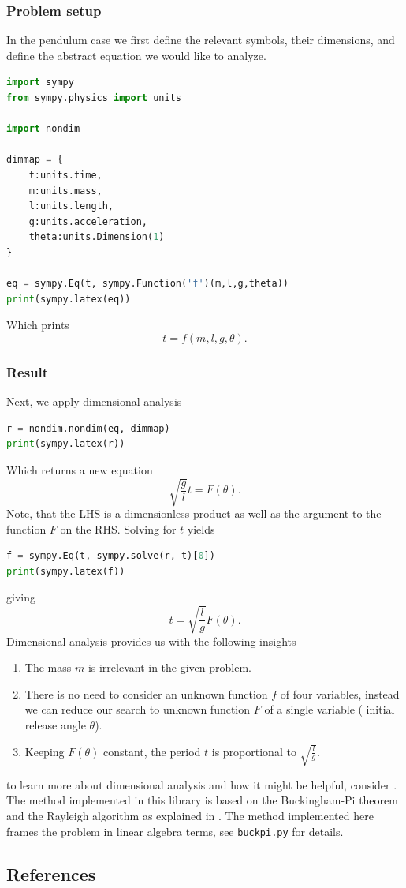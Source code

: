 \documentclass[11pt]{article}
\begin{document}
\subsubsection{Problem setup}
In the pendulum case we first define the relevant symbols, their dimensions, and define the abstract equation we would like to analyze.
\begin{lstlisting}[language=Python]
import sympy
from sympy.physics import units

import nondim

dimmap = {
    t:units.time, 
    m:units.mass, 
    l:units.length, 
    g:units.acceleration, 
    theta:units.Dimension(1)
}

eq = sympy.Eq(t, sympy.Function('f')(m,l,g,theta))
print(sympy.latex(eq))
\end{lstlisting}
Which prints $$t = f{\left(m,l,g,\theta \right)}.$$

\subsubsection{Result}
Next, we apply dimensional analysis
\begin{lstlisting}[language=Python]
r = nondim.nondim(eq, dimmap)
print(sympy.latex(r))
\end{lstlisting}
Which returns a new equation $$\sqrt{\frac{g}{l}}t = F{\left(\theta \right)}.$$ Note, that the LHS is a dimensionless product as well as the argument to the function $F$ on the RHS. Solving for $t$ yields
\begin{lstlisting}[language=Python]
f = sympy.Eq(t, sympy.solve(r, t)[0])
print(sympy.latex(f))
\end{lstlisting}
giving $$t = \sqrt{\frac{l}{g}}F{\left(\theta \right)}.$$ Dimensional analysis provides us with the following insights
\begin{enumerate}
    \item The mass $m$ is irrelevant in the given problem.
    \item There is no need to consider an unknown function $f$ of four variables, instead we can reduce our search to unknown function $F$ of a single variable ( initial release angle $\theta$).
    \item Keeping $F{\left(\theta \right)}$ constant, the period $t$ is proportional to $\sqrt{\frac{l}{g}}$.
\end{enumerate}

to learn more about dimensional analysis and how it might be helpful, consider \cite{szirtes2007applied, santiago2019first, sonin2001dimensional, lemons2017student,schetz1999fundamentals}. The method implemented in this library is based on the Buckingham-Pi theorem and the Rayleigh algorithm as explained in \cite{szirtes2007applied}. The method implemented here frames the problem in linear algebra terms, see \texttt{buckpi.py} for details.

\subsection{References}

\begingroup
\renewcommand{\section}[2]{}%

\endgroup
\end{document}

